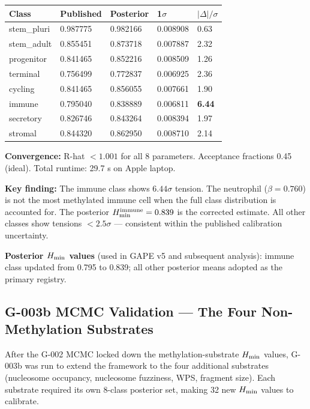 \documentclass[12pt,a4paper]{article}
\begin{document}
\begin{center}
\renewcommand{\arraystretch}{1.2}
\begin{tabular}{lllll}
\toprule
\textbf{Class} & \textbf{Published} & \textbf{Posterior} & \textbf{1$\sigma$} &
\textbf{$|\Delta|/\sigma$} \\
\midrule
stem\_pluri & 0.987775 & 0.982166 & 0.008908 & 0.63 \\
stem\_adult & 0.855451 & 0.873718 & 0.007887 & 2.32 \\
progenitor  & 0.841465 & 0.852216 & 0.008509 & 1.26 \\
terminal    & 0.756499 & 0.772837 & 0.006925 & 2.36 \\
cycling     & 0.841465 & 0.856055 & 0.007661 & 1.90 \\
immune      & 0.795040 & 0.838889 & 0.006811 & \textbf{6.44} \\
secretory   & 0.826746 & 0.843264 & 0.008394 & 1.97 \\
stromal     & 0.844320 & 0.862950 & 0.008710 & 2.14 \\
\bottomrule
\end{tabular}
\end{center}

\noindent \textbf{Convergence:} R-hat $< 1.001$ for all 8 parameters.
Acceptance fractions 0.45 (ideal). Total runtime: 29.7 s on Apple laptop.

\noindent \textbf{Key finding:} The immune class shows $6.44\sigma$ tension.
The neutrophil ($\beta = 0.760$) is not the most methylated immune cell
when the full class distribution is accounted for.
The posterior $H_{\rm min}^{\rm immune} = 0.839$ is the corrected estimate.
All other classes show tensions $< 2.5\sigma$ --- consistent within the
published calibration uncertainty.

\noindent \textbf{Posterior $H_{\rm min}$ values} (used in GAPE v5 and subsequent analysis):
immune class updated from 0.795 to 0.839; all other posterior means
adopted as the primary registry.

\subsection{G-003b MCMC Validation --- The Four Non-Methylation Substrates}
\label{subsec:g003b}

After the G-002 MCMC locked down the methylation-substrate $H_{\rm min}$ values,
G-003b was run to extend the framework to the four additional substrates
(nucleosome occupancy, nucleosome fuzziness, WPS, fragment size). Each
substrate required its own 8-class posterior set, making 32 new $H_{\rm min}$
values to calibrate.
\end{document}
